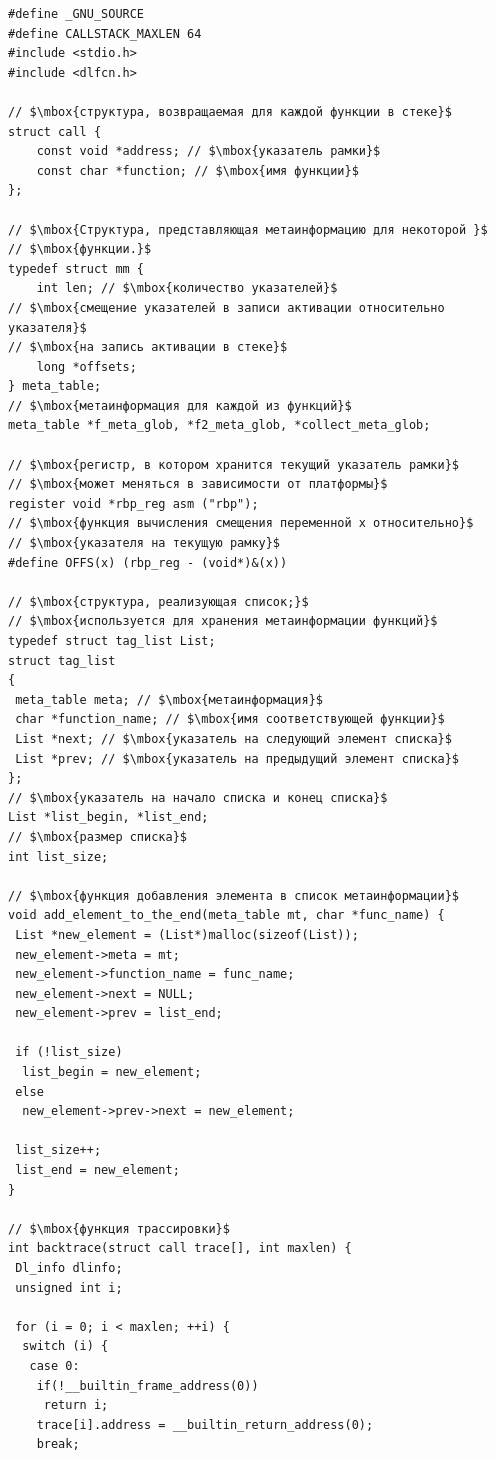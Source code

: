 \begin{lstlisting}[mathescape=true]
#define _GNU_SOURCE
#define CALLSTACK_MAXLEN 64
#include <stdio.h>
#include <dlfcn.h>

// $\mbox{структура, возвращаемая для каждой функции в стеке}$
struct call {
    const void *address; // $\mbox{указатель рамки}$
	const char *function; // $\mbox{имя функции}$
};

// $\mbox{Структура, представляющая метаинформацию для некоторой }$
// $\mbox{функции.}$
typedef struct mm {
	int len; // $\mbox{количество указателей}$
// $\mbox{смещение указателей в записи активации относительно указателя}$
// $\mbox{на запись активации в стеке}$
	long *offsets;
} meta_table;
// $\mbox{метаинформация для каждой из функций}$
meta_table *f_meta_glob, *f2_meta_glob, *collect_meta_glob;

// $\mbox{регистр, в котором хранится текущий указатель рамки}$
// $\mbox{может меняться в зависимости от платформы}$
register void *rbp_reg asm ("rbp");
// $\mbox{функция вычисления смещения переменной x относительно}$
// $\mbox{указателя на текущую рамку}$
#define OFFS(x) (rbp_reg - (void*)&(x))

// $\mbox{структура, реализующая список;}$
// $\mbox{используется для хранения метаинформации функций}$
typedef struct tag_list List;
struct tag_list
{
 meta_table meta; // $\mbox{метаинформация}$
 char *function_name; // $\mbox{имя соответствующей функции}$
 List *next; // $\mbox{указатель на следующий элемент списка}$
 List *prev; // $\mbox{указатель на предыдущий элемент списка}$
};
// $\mbox{указатель на начало списка и конец списка}$
List *list_begin, *list_end;
// $\mbox{размер списка}$
int list_size;

// $\mbox{функция добавления элемента в список метаинформации}$
void add_element_to_the_end(meta_table mt, char *func_name) {
 List *new_element = (List*)malloc(sizeof(List));
 new_element->meta = mt;
 new_element->function_name = func_name;
 new_element->next = NULL;
 new_element->prev = list_end;
	
 if (!list_size)
  list_begin = new_element;
 else 
  new_element->prev->next = new_element;

 list_size++;
 list_end = new_element;
}

// $\mbox{функция трассировки}$
int backtrace(struct call trace[], int maxlen) {
 Dl_info dlinfo;
 unsigned int i;

 for (i = 0; i < maxlen; ++i) {
  switch (i) {
   case 0:
    if(!__builtin_frame_address(0)) 
     return i;
    trace[i].address = __builtin_return_address(0);
    break;


\end{lstlisting}
